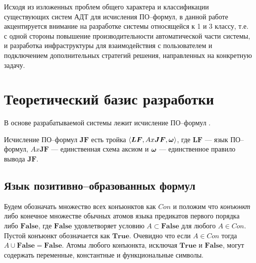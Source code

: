 

Исходя из изложенных проблем общего характера и классификации существующих систем АДТ для исчисления ПО--формул, в данной работе акцентируется внимание на разработке системы относящейся к 1 и 3 классу, т.е. с одной стороны повышение производительности автоматической части системы, и разработка инфраструктуры для взаимодействия с пользователем и подключением дополнительных стратегий решения, направленных на конкретную задачу.


\section{Теоретический базис разработки}

В основе разрабатываемой системы лежит исчисление ПО--формул \cite{ICDS2000}.

Исчисление ПО--формул $\boldsymbol{JF}$ есть тройка $\left\langle \boldsymbol{LF}, Ax\boldsymbol{JF}, \boldsymbol{\omega} \right\rangle$, где $\boldsymbol{LF}$ --- язык ПО--формул, $Ax\boldsymbol{JF}$ --- единственная схема аксиом и $\boldsymbol{\omega}$ --- единственное правило вывода $\boldsymbol{JF}.$

\subsection{Язык позитивно--образованных формул}

Будем обозначать множество всех конъюнктов как $Con$ и положим что {\em конъюнкт} либо конечное множестве обычных атомов языка предикатов первого порядка либо $\boldsymbol{False}$, где $\boldsymbol{False}$ удовлетворяет условию $A \subset \boldsymbol{False} $ для любого $A \in Con$. Пустой конъюнкт обозначается как $\boldsymbol{True}$. Очевидно что если $A \in Con$ тогда $A \cup \boldsymbol{False} = \boldsymbol{False}$. Атомы любого конъюнкта, исключая $\boldsymbol{True}$ и $\boldsymbol{False}$, могут содержать переменные, константные и функциональные символы.


